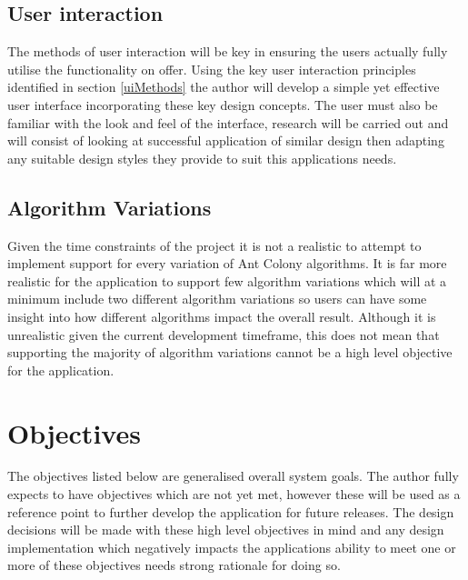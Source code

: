 \subsection{User interaction}

The methods of user interaction will be key in ensuring the users actually fully utilise the functionality on offer. Using the key user interaction principles identified in section \ref{uiMethods} the author will develop a simple yet effective user interface incorporating these key design concepts. The user must also be familiar with the look and feel of the interface, research will be carried out and will consist of looking at successful application of similar design then adapting any suitable design styles they provide to suit this applications needs.

\subsection{Algorithm Variations}

Given the time constraints of the project it is not a realistic to attempt to implement support for every variation of Ant Colony algorithms. It is far more realistic for the application to support few algorithm variations which will at a minimum include two different algorithm variations so users can have some insight into how different algorithms impact the overall result. Although it is unrealistic given the current development timeframe, this does not mean that supporting the majority of algorithm variations cannot be a high level objective for the application.

\section{Objectives}
\label{objy}
The objectives listed below are generalised overall system goals. The author fully expects to have objectives which are not yet met, however these will be used as a reference point to further develop the application for future releases. The design decisions will be made with these high level objectives in mind and any design implementation which negatively impacts the applications ability to meet one or more of these objectives needs strong rationale for doing so.


